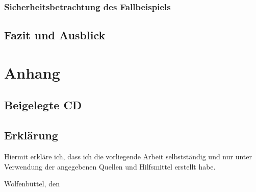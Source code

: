 \documentclass[
  a4paper,					    %
  twoside,
  DIV=calc,     				%
  bibliography=totoc,
  cleardoublepage=empty,
  ngerman,     					%
  final       					%
]{scrbook}
\begin{document}
\section{Sicherheitsbetrachtung des Fallbeispiels}
\label{sec:Sicherheit_Beispiel}











\chapter{Fazit und Ausblick}
\label{sec:FazitAusblick}











\appendix
\part*{Anhang}






\backmatter



\chapter{Beigelegte CD}
\label{sec:BeigelegteCD}



\chapter{Erklärung}
\label{sec:Erklärung}
Hiermit erkläre ich, dass ich die vorliegende Arbeit selbstständig und nur unter Verwendung der angegebenen Quellen und Hilfsmittel erstellt habe.
\vspace{2.5cm} \par
Wolfenbüttel, den %
\end{document}
